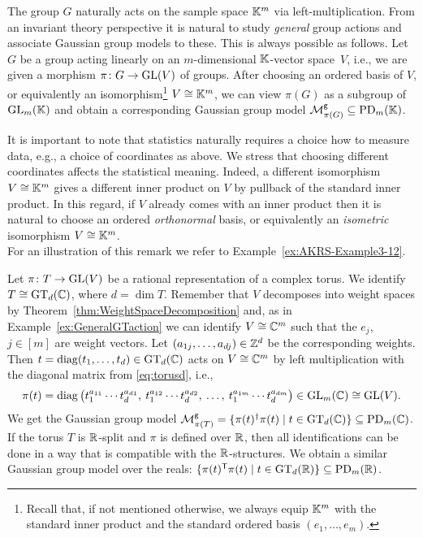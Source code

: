 The group $G$ naturally acts on the sample space $\mathbb K^m$ via left-multiplication. From an invariant theory perspective it is natural to study \emph{general} group actions and associate Gaussian group models to these. This is always possible as follows. Let $G$ be a group acting linearly on an $m$-dimensional $\mathbb K$-vector space~$V$, i.e., we are given a morphism $\pi \colon G \to \operatorname{GL}(V)$ of groups. After choosing an ordered basis of $V$, or equivalently an isomorphism\footnote{Recall that, if not mentioned otherwise, we always equip $\mathbb K^m$ with the standard inner product and the standard ordered basis $(e_1, \ldots, e_m)$.}  $V \cong \mathbb K^m$, we can view $\pi(G)$ as a subgroup of $\operatorname{GL}_m(\mathbb K)$ and obtain a corresponding Gaussian group model $\mathcal{M}^{\mathtt{g}}_{\pi(G)} \subseteq \operatorname{PD}_m(\mathbb K)$.

\begin{remark}\label{rem:ModelsViaAction}
	It is important to note that statistics naturally requires a choice how to measure data, e.g., a choice of coordinates as above.
	We stress that choosing different coordinates affects the statistical meaning. Indeed, a different isomorphism $V \cong \mathbb K^m$ gives a different inner product on $V$ by pullback of the standard inner product.
	In this regard, if $V$ already comes with an inner product then it is natural to choose an ordered \emph{orthonormal} basis, or equivalently an \emph{isometric} isomorphism $V \cong \mathbb K^m$.\\
	For an illustration of this remark we refer to Example~\ref{ex:AKRS-Example3-12}.
	\hfill\remSymbol
\end{remark}

\begin{example}\label{ex:GeneralTorusActionMgG}
	Let $\pi \colon T \to \operatorname{GL}(V)$ be a rational representation of a complex torus. We identify $T \cong \operatorname{GT}_d(\mathbb C)$, where $d = \dim T$. Remember that $V$ decomposes into weight spaces by Theorem~\ref{thm:WeightSpaceDecomposition} and, as in Example~\ref{ex:GeneralGTaction} we can identify $V \cong \mathbb C^m$ such that the $e_j$, $j \in [m]$ are weight vectors. Let  $(a_{1j},\ldots,a_{dj}) \in \mathbb Z^d$ be the corresponding weights. Then $t  = \operatorname{diag}(t_1,\ldots,t_d) \in \operatorname{GT}_d(\mathbb C)$ acts on $V \cong \mathbb C^m$ by left multiplication with the diagonal matrix from \eqref{eq:torusd}, i.e.,
		\[ \pi(t) = \operatorname{diag} \big( t_1^{a_{11}} \cdots t_d^{a_{d1}}, \: t_1^{a_{12}} \cdots t_d^{a_{d2}},\:  \ldots,\:  t_1^{a_{1m}} \cdots t_d^{a_{dm}}  \big) \in \operatorname{GL}_m(\mathbb C) \cong \operatorname{GL}(V) . \]
	We get the Gaussian group model $\mathcal{M}^{\mathtt{g}}_{\pi(T)} = \{ \pi(t)^{\dagger} \pi(t) \mid t \in \operatorname{GT}_d(\mathbb C) \} \subseteq \operatorname{PD}_m(\mathbb C)$. If the torus $T$ is $\mathbb R$-split and $\pi$ is defined over $\mathbb R$, then all identifications can be done in a way that is compatible with the $\mathbb R$-structures. We obtain a similar Gaussian group model over the reals: $\{ \pi(t)^{\mathsf{T}} \pi(t) \mid t \in \operatorname{GT}_d(\mathbb R) \} \subseteq \operatorname{PD}_m(\mathbb R)$.
	\hfill\exSymbol
\end{example}

